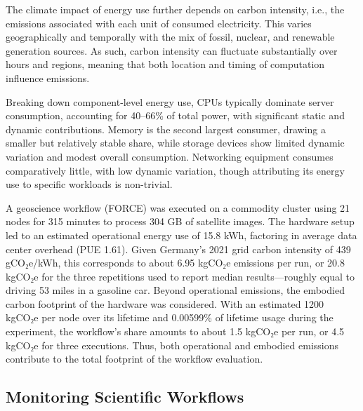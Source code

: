 The climate impact of energy use further depends on carbon intensity, i.e., the emissions associated with each unit of consumed electricity. This varies geographically and temporally with the mix of fossil, nuclear, and renewable generation sources. As such, carbon intensity can fluctuate substantially over hours and regions, meaning that both location and timing of computation influence emissions.

Breaking down component-level energy use, CPUs typically dominate server consumption, accounting for 40–66\% of total power, with significant static and dynamic contributions. Memory is the second largest consumer, drawing a smaller but relatively stable share, while storage devices show limited dynamic variation and modest overall consumption. Networking equipment consumes comparatively little, with low dynamic variation, though attributing its energy use to specific workloads is non-trivial.

A geoscience workflow (FORCE) was executed on a commodity cluster using 21 nodes for 315 minutes to process 304 GB of satellite images. The hardware setup led to an estimated operational energy use of 15.8 kWh, factoring in average data center overhead (PUE 1.61). Given Germany’s 2021 grid carbon intensity of 439 gCO₂e/kWh, this corresponds to about 6.95 kgCO₂e emissions per run, or 20.8 kgCO₂e for the three repetitions used to report median results—roughly equal to driving 53 miles in a gasoline car. Beyond operational emissions, the embodied carbon footprint of the hardware was considered. With an estimated 1200 kgCO₂e per node over its lifetime and 0.00599\% of lifetime usage during the experiment, the workflow’s share amounts to about 1.5 kgCO₂e per run, or 4.5 kgCO₂e for three executions. Thus, both operational and embodied emissions contribute to the total footprint of the workflow evaluation.

\subsection{Monitoring Scientific Workflows}
\label{sec:background_monitoring}

